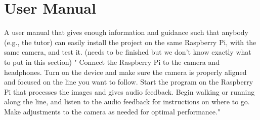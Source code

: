 \documentclass{article}
\begin{document}
\section{User Manual}
A user manual that gives enough information and guidance such that anybody (e.g., the tutor) can easily install the project on the same Raspberry Pi, with the same camera, and test it.
(needs to be finished but we don't know exactly what to put in this section)
" Connect the Raspberry Pi to the camera and headphones.
Turn on the device and make sure the camera is properly aligned and focused on the line you want to follow.
Start the program on the Raspberry Pi that processes the images and gives audio feedback.
Begin walking or running along the line, and listen to the audio feedback for instructions on where to go.
Make adjustments to the camera as needed for optimal performance."
\end{document}
